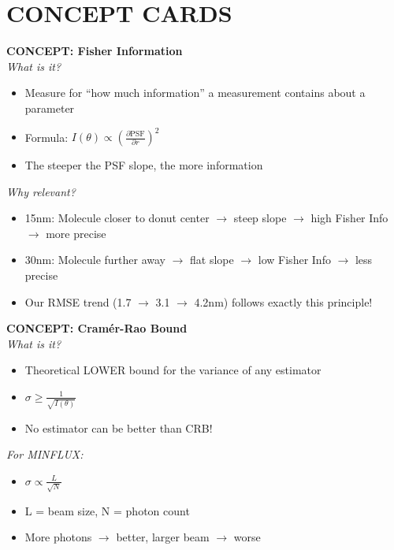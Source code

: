 \documentclass[a4paper,10pt]{article}
\begin{document}
\newpage

\section*{CONCEPT CARDS}

\begin{mdframed}[style=konzept]
\textbf{CONCEPT: Fisher Information}\\[5pt]
\textit{What is it?}
\begin{itemize}[leftmargin=*, nosep]
    \item Measure for ``how much information'' a measurement contains about a parameter
    \item Formula: $I(\theta) \propto \left(\frac{\partial \text{PSF}}{\partial r}\right)^2$
    \item The steeper the PSF slope, the more information
\end{itemize}
\textit{Why relevant?}
\begin{itemize}[leftmargin=*, nosep]
    \item 15nm: Molecule closer to donut center $\rightarrow$ steep slope $\rightarrow$ high Fisher Info $\rightarrow$ more precise
    \item 30nm: Molecule further away $\rightarrow$ flat slope $\rightarrow$ low Fisher Info $\rightarrow$ less precise
    \item Our RMSE trend (1.7 $\rightarrow$ 3.1 $\rightarrow$ 4.2nm) follows exactly this principle!
\end{itemize}
\end{mdframed}

\begin{mdframed}[style=konzept]
\textbf{CONCEPT: Cram\'er-Rao Bound}\\[5pt]
\textit{What is it?}
\begin{itemize}[leftmargin=*, nosep]
    \item Theoretical LOWER bound for the variance of any estimator
    \item $\sigma \geq \frac{1}{\sqrt{I(\theta)}}$
    \item No estimator can be better than CRB!
\end{itemize}
\textit{For MINFLUX:}
\begin{itemize}[leftmargin=*, nosep]
    \item $\sigma \propto \frac{L}{\sqrt{N}}$
    \item L = beam size, N = photon count
    \item More photons $\rightarrow$ better, larger beam $\rightarrow$ worse
\end{itemize}
\end{mdframed}
\end{document}
